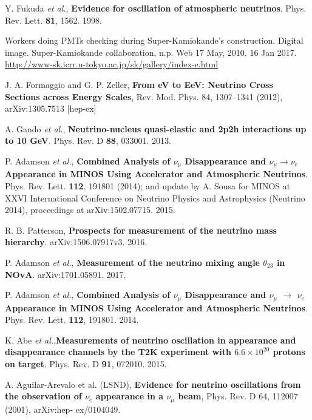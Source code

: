  Y. Fukuda \textit{et al.}, \textbf{Evidence for oscillation of atmospheric neutrinos}. Phys. Rev. Lett. \textbf{81}, 1562. 1998.  

 Workers doing PMTs checking during Super-Kamiokande's construction. Digital image. Super-Kamiokande collaboration, n.p. Web 17 May, 2010. 16 Jan 2017. \href{http://www-sk.icrr.u-tokyo.ac.jp/sk/gallery/index-e.html}{http://www-sk.icrr.u-tokyo.ac.jp/sk/gallery/index-e.html}

 J. A. Formaggio and G. P. Zeller, \textbf{From eV to EeV: Neutrino Cross Sections across Energy Scales}, Rev. Mod. Phys. 84, 1307–1341 (2012), arXiv:1305.7513 [hep-ex]

 A. Gando \textit{et al.}, \textbf{Neutrino-nucleus quasi-elastic and 2p2h interactions up to 10 GeV}. Phys. Rev. D \textbf{88}, 033001. 2013.

 P. Adamson \textit{et al.}, \textbf{Combined Analysis of $\nu_\mu$ Disappearance and $\nu_\mu \rightarrow \nu_e$ Appearance in MINOS Using Accelerator and Atmospheric Neutrinos}. Phys. Rev. Lett. \textbf{112}, 191801 (2014); and update by A. Sousa for MINOS at XXVI International
Conference on Neutrino Physics and Astrophysics (Neutrino 2014), proceedings at arXiv:1502.07715. 2015.

 R. B. Patterson, \textbf{Prospects for measurement of the neutrino mass hierarchy}. arXiv:1506.07917v3. 2016.

 P. Adamson \textit{et al.}, \textbf{Measurement of the neutrino mixing angle $\theta_{23}$ in NOvA}. arXiv:1701.05891. 2017.

 P. Adamson \textit{et al.}, \textbf{Combined Analysis of $\nu_\mu$ Disappearance and $\nu_\mu$ $\rightarrow $ $\nu_e$ Appearance in MINOS Using Accelerator and Atmospheric Neutrinos}. Phys. Rev. Lett. \textbf{112}, 191801. 2014.

 K. Abe \textit{et al.},\textbf{Measurements of neutrino oscillation in appearance and disappearance channels by the T2K experiment with $6.6 \times 10^{20} $ protons on target}. Phys. Rev. D \textbf{91}, 072010. 2015.

 A. Aguilar-Arevalo et al. (LSND), \textbf{Evidence for neutrino oscillations from the observation of $\nu_e$ appearance in a $\nu_{\mu}$ beam}, Phys. Rev. D 64, 112007 (2001), arXiv:hep- ex/0104049.

